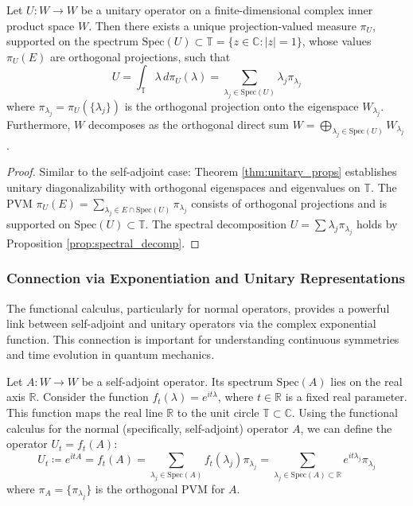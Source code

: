 \begin{theorem}
\label{thm:spectral_thm_unitary}
Let $U: W \to W$ be a unitary operator on a finite-dimensional complex inner product space $W$. Then there exists a unique projection-valued measure $\pi_U$, supported on the spectrum $\text{Spec}(U) \subset \mathbb{T} = \{ z \in \mathbb{C} : |z| = 1 \}$, whose values $\pi_U(E)$ are orthogonal projections, such that
\[ U = \int_{\mathbb{T}} \lambda \, d\pi_U(\lambda) = \sum_{\lambda_j \in \text{Spec}(U)} \lambda_j \pi_{\lambda_j} \]
where $\pi_{\lambda_j} = \pi_U(\{\lambda_j\})$ is the orthogonal projection onto the eigenspace $W_{\lambda_j}$. Furthermore, $W$ decomposes as the orthogonal direct sum $W = \bigoplus_{\lambda_j \in \text{Spec}(U)} W_{\lambda_j}$.
\end{theorem}
\begin{proof}
Similar to the self-adjoint case: Theorem \ref{thm:unitary_props} establishes unitary diagonalizability with orthogonal eigenspaces and eigenvalues on $\mathbb{T}$. The PVM $\pi_U(E) = \sum_{\lambda_j \in E \cap \text{Spec}(U)} \pi_{\lambda_j}$ consists of orthogonal projections and is supported on $\text{Spec}(U) \subset \mathbb{T}$. The spectral decomposition $U = \sum \lambda_j \pi_{\lambda_j}$ holds by Proposition \ref{prop:spectral_decomp}.
\end{proof}

\subsubsection{Connection via Exponentiation and Unitary Representations}
\label{subsec:exponentiation}

The functional calculus, particularly for normal operators, provides a powerful link between self-adjoint and unitary operators via the complex exponential function. This connection is important for understanding continuous symmetries and time evolution in quantum mechanics.

Let $A: W \to W$ be a self-adjoint operator. Its spectrum $\text{Spec}(A)$ lies on the real axis $\mathbb{R}$. Consider the function $f_t(\lambda) = e^{it\lambda}$, where $t \in \mathbb{R}$ is a fixed real parameter. This function maps the real line $\mathbb{R}$ to the unit circle $\mathbb{T} \subset \mathbb{C}$. Using the functional calculus for the normal (specifically, self-adjoint) operator $A$, we can define the operator $U_t = f_t(A)$:
\[ U_t \coloneqq e^{itA} = f_t(A) = \sum_{\lambda_j \in \text{Spec}(A)} f_t(\lambda_j) \pi_{\lambda_j} = \sum_{\lambda_j \in \text{Spec}(A) \subset \mathbb{R}} e^{it\lambda_j} \pi_{\lambda_j} \]
where $\pi_A = \{\pi_{\lambda_j}\}$ is the orthogonal PVM for $A$.

